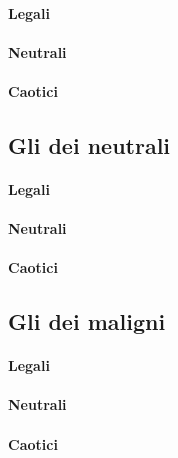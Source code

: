 \paragraph{Legali}
\paragraph{Neutrali}
\paragraph{Caotici}

\subsection{Gli dei neutrali}
\paragraph{Legali}
\paragraph{Neutrali}
\paragraph{Caotici}

\subsection{Gli dei maligni}
\paragraph{Legali}
\paragraph{Neutrali}
\paragraph{Caotici}
